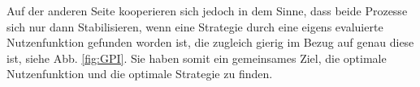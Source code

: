 Auf der anderen Seite kooperieren sich jedoch in dem Sinne, dass beide Prozesse sich nur dann Stabilisieren, wenn eine Strategie durch eine eigens evaluierte Nutzenfunktion gefunden worden ist, die zugleich gierig im Bezug auf genau diese ist, siehe Abb. \ref{fig:GPI}. Sie haben somit ein gemeinsames Ziel, die optimale Nutzenfunktion und die optimale Strategie zu finden.